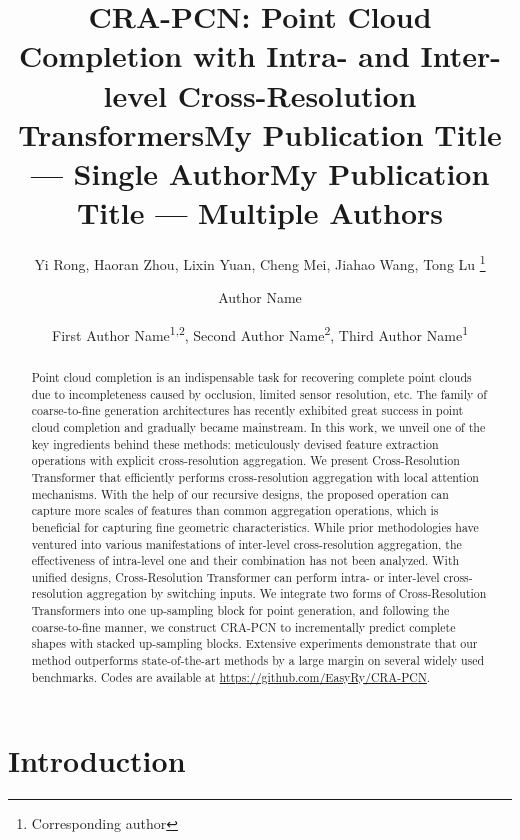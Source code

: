 \documentclass[letterpaper]{article} %
\title{CRA-PCN: Point Cloud Completion with Intra- and Inter-level Cross-Resolution Transformers}
\author{
    Yi Rong,
    Haoran Zhou,
    Lixin Yuan,
    Cheng Mei,
    Jiahao Wang,
    Tong Lu \thanks{Corresponding author}
}
\title{My Publication Title --- Single Author}
\author {
    Author Name
}
\title{My Publication Title --- Multiple Authors}
\author {
    First Author Name\textsuperscript{\rm 1,\rm 2},
    Second Author Name\textsuperscript{\rm 2},
    Third Author Name\textsuperscript{\rm 1}
}
\begin{document}
\maketitle

\begin{abstract}
Point cloud completion is an indispensable task for recovering complete point clouds due to incompleteness caused by occlusion, limited sensor resolution, etc.
The family of coarse-to-fine generation architectures has recently exhibited great success in point cloud completion and gradually became mainstream.
In this work, we unveil one of the key ingredients behind these methods: meticulously devised feature extraction operations with explicit cross-resolution aggregation.
We present Cross-Resolution Transformer that efficiently performs cross-resolution aggregation with local attention mechanisms.
With the help of our recursive designs, the proposed operation  can capture more scales of features than common aggregation operations, which is beneficial for capturing fine geometric characteristics.
While prior methodologies have ventured into various manifestations of inter-level cross-resolution aggregation, the effectiveness of intra-level one and their combination has not been analyzed.
With unified designs, Cross-Resolution Transformer can perform intra- or inter-level cross-resolution aggregation by switching inputs.
We integrate two forms of Cross-Resolution Transformers into one up-sampling block for point generation, and following the coarse-to-fine manner, we construct CRA-PCN to incrementally predict complete shapes with stacked up-sampling blocks.
Extensive experiments  demonstrate that our method outperforms state-of-the-art methods by a large margin on several widely used benchmarks.
Codes are available at \url{https://github.com/EasyRy/CRA-PCN}.
\end{abstract}

\section{Introduction}
\end{document}

